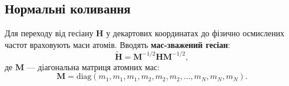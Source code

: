 %
%
%
%

\subsection{Нормальні коливання}

Для переходу від гесіану $\mathbf{H}$ у декартових координатах до фізично осмислених частот враховують маси атомів.
Вводять \textbf{мас-зважений гесіан}:
\begin{equation}\label{eq:mass-weighted-H}
    \mathbf{\tilde{H}} = \mathbf{M}^{-1/2} \mathbf{H} \mathbf{M}^{-1/2},
\end{equation}
де $\mathbf{M}$ --- діагональна матриця атомних мас:
\begin{equation*}
    \mathbf{M} =
    \mathrm{diag}(m_1, m_1, m_1, m_2, m_2, m_2, \ldots, m_N, m_N, m_N).
\end{equation*}

